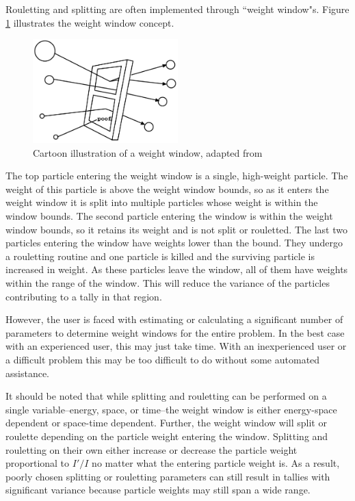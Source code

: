 Rouletting and splitting are often implemented through ``weight window"s. 
Figure \ref{fig:ww-mcnp}
illustrates the weight window concept.
%
\begin{figure}
  \centering
  \includegraphics[width=0.5\textwidth]{./chapters/lit_review/figures/ww-mcnp.png}
  \caption[Weight window illustration]{Cartoon illustration of a weight window,
    adapted from \cite{brown_mcnp_2002, mcnp_manual_v2}}
  \label{fig:ww-mcnp}
\end{figure}
%
The top particle entering the weight window is a single, high-weight
particle. The weight of this particle is above the weight window bounds, so as
it enters the weight window it is split into multiple particles whose weight is
within the window bounds. The second particle entering the window is within the
weight window bounds, so it retains its weight and is not split or rouletted.
The last two particles entering the window have weights lower than the bound.
They undergo a rouletting routine and one particle is killed and the surviving
particle is increased in weight. As these particles leave the window, all of
them have weights within the range of the window. This will reduce the variance
of the particles contributing to a tally in that region. 

However, the user is
faced with estimating or calculating a significant number of parameters to
determine weight windows for the entire problem. In the best case with an
experienced user, this may just take time. With an inexperienced user or a
difficult problem this may be too difficult to do without some automated
assistance.

It should be noted that
while splitting and rouletting can be performed on a single variable--energy,
space, or time--the weight window is either energy-space
dependent or space-time dependent. Further, the weight window will split or
roulette depending on the particle weight entering the window. Splitting and
rouletting on their own either increase or decrease the particle weight
proportional to $I'/I$ no matter what the entering particle weight is. 
As a
result, poorly chosen splitting or rouletting parameters can still
result in tallies with significant variance because particle weights may still span a wide
range.

